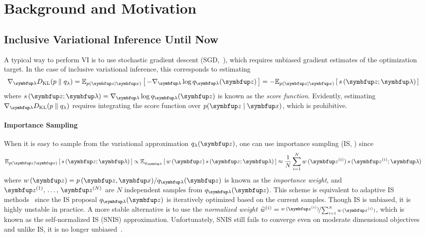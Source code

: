 
\section{Background and Motivation}
\subsection{Inclusive Variational Inference Until Now}\label{section:ivi_previous}
A typical way to perform VI is to use stochastic gradient descent (SGD,~\citealt{robbins_stochastic_1951, bottou_online_1999}), which requires unbiased gradient estimates of the optimization target.
In the case of inclusive variational inference, this corresponds to estimating
%
\begin{align}
  \nabla_{\vlambda} \DKL{p}{q_{\lambda}}
  = \Esub{p(\vz\mid\vx)}{ - \nabla_{\vlambda} \log q_{\vlambda}(\vz) }
  = - \Esub{p(\vz\mid\vx)}{ s\,(\vz; \vlambda) }
\end{align}
where \(s\,(\vz; \vlambda) = \nabla_{\vlambda} \log q_{\vlambda}(\vz)\) is known as the \textit{score function}.
Evidently, estimating \(\nabla_{\vlambda} \DKL{p}{q_{\lambda}}\) requires integrating the score function over \(p(\vz\mid\vx)\), which is prohibitive.

\paragraph{Importance Sampling}
When it is easy to sample from the variational approximation \(q_{\lambda}(\vz)\), one can use importance sampling (IS, \citealt{robert_monte_2004, mcbook}) since 
\begin{align}
  \Esub{p(\vz\mid\vx)}{ s\,(\vz; \vlambda) }
  \propto \Esub{q_{\vlambda}}{ w\,(\vz) \, s\,(\vz; \vlambda) }
  \approx \frac{1}{N} \sum^{N}_{i=1} w\,(\vz^{(i)}) \, s\,(\vz^{(i)}; \vlambda)
\end{align}
where \(w\,(\vz) = p\,(\vz,\vx) / q_{\vlambda}(\vz)\) is known as the \textit{importance weight}, and \(\vz^{(1)},\, \ldots,\, \vz^{(N)}\) are \(N\) independent samples from \(q_{\vlambda}(\vz)\).
This scheme is equivalent to adaptive IS methods~\citep{cappe_adaptive_2008, bugallo_adaptive_2017} since the IS proposal \(q_{\vlambda}(\vz)\) is iteratively optimized based on the current samples.
Though IS is unbiased, it is highly unstable in practice.
A more stable alternative is to use the \textit{normalized weight} \(\widetilde{w}^{(i)} = \nicefrac{w\,(\vz^{(i)})}{\sum_{i=1}^N w\,(\vz^{(i)}) }\), which is known as the self-normalized IS (SNIS) approximation.
Unfortunately, SNIS still fails to converge even on moderate dimensional objectives and unlike IS, it is no longer unbiased~\citep{robert_monte_2004, mcbook}.

